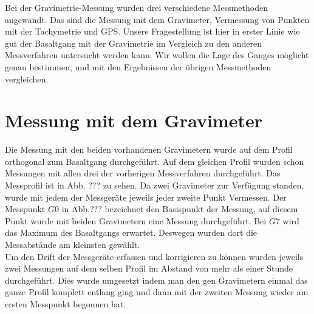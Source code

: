 

Bei der Gravimetrie-Messung wurden drei verschiedene Messmethoden angewandt. Das sind die Messung mit dem Gravimeter, Vermessung von Punkten mit der Tachymetrie und GPS.
Unsere Fragestellung ist hier in erster Linie wie gut der Basaltgang mit der Gravimetrie im Vergleich zu den anderen Messverfahren untersucht werden kann.  Wir wollen die Lage des Ganges möglicht genau bestimmen, und mit den 
Ergebnissen der übrigen Messmethoden vergleichen.

\section{Messung mit dem Gravimeter}
Die Messung mit den beiden vorhandenen Gravimetern wurde auf dem Profil orthogonal zum Basaltgang durchgeführt. Auf dem gleichen Profil wurden schon Messungen mit allen drei der vorherigen Messverfahren durchgeführt.
Das Messprofil ist in Abb. ??? zu sehen. Da zwei Gravimeter zur Verfügung standen, wurde mit jedem der Messgeräte jeweils jeder zweite Punkt Vermessen. Der Messpunkt $G0$ in Abb.??? bezeichnet den Basispunkt der Messung, auf
diesem Punkt wurde mit beiden Gravimetern eine Messung durchgeführt. Bei $G7$ wird das Maximum des Basaltgangs erwartet. Deswegen wurden dort die Messabstände am kleinsten gewählt.\\
Um den Drift der Messgeräte erfassen und korrigieren zu können wurden jeweils zwei Messungen auf dem selben Profil im Abstand von mehr als einer Stunde durchgeführt. Dies wurde umgesetzt indem man den gen Gravimetern 
einmal das ganze Profil komplett entlang ging und dann mit der zweiten Messung wieder am ersten Messpunkt begonnen hat.\\  
\\


